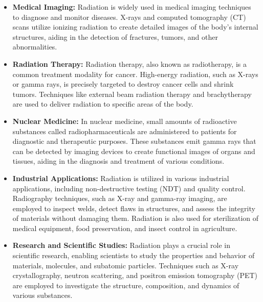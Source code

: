 \documentclass[../introduction.tex]{subfiles}
\begin{document}
        \begin{itemize}
            \item \textbf{Medical Imaging:} Radiation is widely used in medical imaging techniques to diagnose and monitor diseases. X-rays and 
            computed tomography (CT) scans utilize ionizing radiation to create detailed images of the body's internal structures, aiding in the 
            detection of fractures, tumors, and other abnormalities.

            \item \textbf{Radiation Therapy:} Radiation therapy, also known as radiotherapy, is a common treatment modality for cancer. 
            High-energy radiation, such as X-rays or gamma rays, is precisely targeted to destroy cancer cells and shrink tumors. Techniques like 
            external beam radiation therapy and brachytherapy are used to deliver radiation to specific areas of the body.

            \item \textbf{Nuclear Medicine:} In nuclear medicine, small amounts of radioactive substances called radiopharmaceuticals are 
            administered to patients for diagnostic and therapeutic purposes. These substances emit gamma rays that can be detected by imaging 
            devices to create functional images of organs and tissues, aiding in the diagnosis and treatment of various conditions.

            \item \textbf{Industrial Applications:} Radiation is utilized in various industrial applications, including non-destructive testing (NDT) 
            and quality control. Radiography techniques, such as X-ray and gamma-ray imaging, are employed to inspect welds, detect flaws in 
            structures, and assess the integrity of materials without damaging them. Radiation is also used for sterilization of medical equipment, 
            food preservation, and insect control in agriculture.

            \item \textbf{Research and Scientific Studies:} Radiation plays a crucial role in scientific research, enabling scientists to study 
            the properties and behavior of materials, molecules, and subatomic particles. Techniques such as X-ray crystallography, 
            neutron scattering, and positron emission tomography (PET) are employed to investigate the structure, composition, and dynamics of 
            various substances.


\end{itemize}
\end{document}
